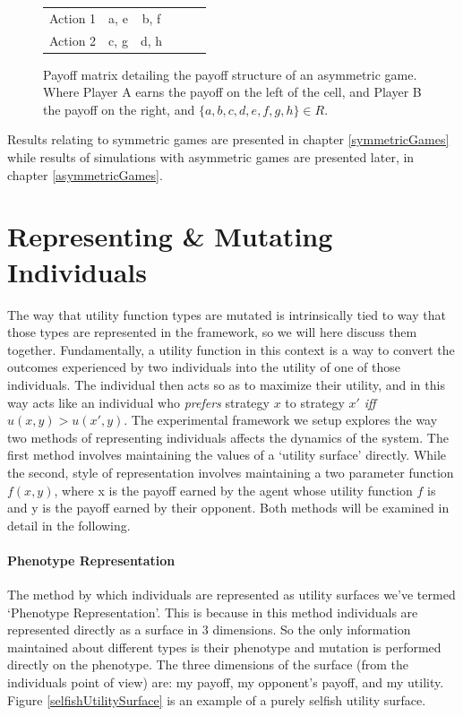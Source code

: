 \documentclass[11pt]{book}
\newcommand*{\np}{\par\noindent\newline}
\begin{document}
\begin{figure}[H]
	\vspace{30px}
	\centering
	\begin{tabular}{|l||*{5}{c|}}\hline
		\backslashbox{Player A}{Player B}
		&\makebox[7em]{Action 1}&\makebox[7em]{Action 2}\\\hline\hline
		Action 1 & a, e & b, f\\\hline
		Action 2 & c, g & d, h \\\hline
	\end{tabular}
	\caption{Payoff matrix detailing the payoff structure of an asymmetric game. Where Player A earns the payoff on the left of the cell, and Player B the payoff on the right, and $\{a, b, c, d, e, f, g, h\} \in R$.}
	\label{asymmetricGame}
	\vspace{20px}
\end{figure}

\np Results relating to symmetric games are presented in chapter \ref{symmetricGames}
while results of simulations with asymmetric games are presented later, in chapter \ref{asymmetricGames}.


\section{Representing \& Mutating Individuals}\label{representing_mutating}
\np The way that utility function types are mutated is intrinsically tied to way that those types are represented in the framework, so we will here discuss them together.
Fundamentally, a utility function in this context is a way to convert the outcomes experienced by two individuals into the utility of one of those individuals.
The individual then acts so as to maximize their utility, and in this way acts like an individual who \textit{prefers} strategy $x$ to strategy $x'$ \textit{iff} $u(x, y) > u(x', y)$.
The experimental framework we setup explores the way two methods of representing individuals affects the dynamics of the system.
The first method involves maintaining the values of a `utility surface' directly. 
While the second, style of representation involves maintaining a two parameter function $f(x,y)$, where x is the payoff earned by the agent whose utility function $f$ is and y is the payoff earned by their opponent. 
Both methods will be examined in detail in the following.

\paragraph{Phenotype Representation}
\np The method by which individuals are represented as utility surfaces we've termed `Phenotype Representation'.
This is because in this method individuals are represented directly as a surface in 3 dimensions.
So the only information maintained about different types is their phenotype and mutation is performed directly on the phenotype.
The three dimensions of the surface (from the individuals point of view) are: my payoff, my opponent's payoff, and my utility.
Figure \ref{selfishUtilitySurface} is an example of a purely selfish utility surface.
\end{document}
